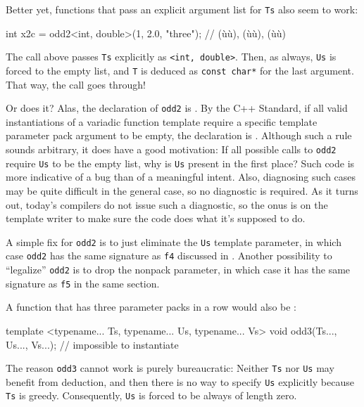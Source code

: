 \noindent Better yet, functions that pass an explicit argument list for
\lstinline!Ts! also seem to work:

\begin{emcppslisting}
int x2c = odd2<int, double>(1, 2.0, "three");
    // (ù{}ù), (ù{}ù), (ù{}ù)
\end{emcppslisting}
    

\noindent The call above passes \lstinline!Ts! explicitly as
\lstinline!<int,!~\lstinline!double>!. Then, as always, \lstinline!Us! is forced
to the empty list, and \lstinline!T! is deduced as
\lstinline!const!~\lstinline!char*! for the last argument. That way, the call
goes through!

Or does it? Alas, the declaration of \lstinline!odd2! is . By
the C++ Standard, if all valid instantiations of a variadic function
template require a specific template parameter pack argument to be
empty, the declaration is . Although such a rule sounds
arbitrary, it does have a good motivation: If all possible calls to
\lstinline!odd2! require \lstinline!Us! to be the empty list, why is
\lstinline!Us! present in the first place? Such code is more indicative of
a bug than of a meaningful intent. Also, diagnosing such cases may be
quite difficult in the general case, so no diagnostic is required. As it
turns out, today's compilers do not issue such a diagnostic, so the onus
is on the template writer to make sure the code does what it's supposed
to do.

A simple fix for \lstinline!odd2! is to just eliminate the \lstinline!Us!
template parameter, in which case \lstinline!odd2! has the same signature
as \lstinline!f4! discussed in . Another possibility to ``legalize'' \lstinline!odd2! is to
drop the nonpack parameter, in which case it has the same signature as
\lstinline!f5! in the same section.

A function that has three parameter packs in a row would also be
:

\begin{emcppslisting}
template <typename... Ts, typename... Us, typename... Vs>
void odd3(Ts..., Us..., Vs...);  // impossible to instantiate
\end{emcppslisting}
    

\noindent The reason \lstinline!odd3! cannot work is purely bureaucratic: Neither
\lstinline!Ts! nor \lstinline!Us! may benefit from deduction, and then there
is no way to specify \lstinline!Us! explicitly because \lstinline!Ts! is
greedy. Consequently, \lstinline!Us! is forced to be always of length zero.

